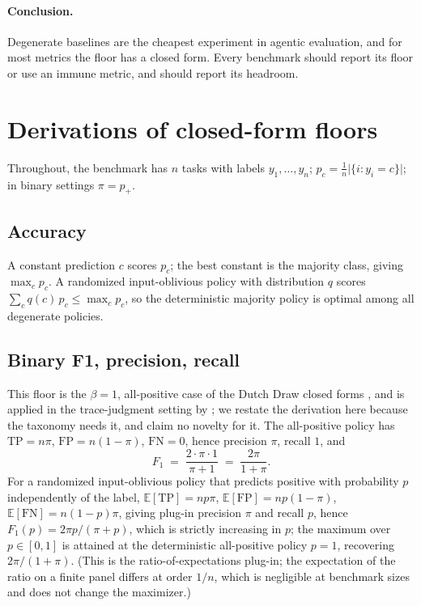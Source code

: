 \documentclass{article}
\theoremstyle{plain}
\theoremstyle{definition}
\begin{document}
\paragraph{Conclusion.}
Degenerate baselines are the cheapest experiment in agentic evaluation, and for most metrics the floor has a closed form. Every benchmark should report its floor or use an immune metric, and should report its headroom.




\appendix

\section{Derivations of closed-form floors}
\label{app:derivations}

Throughout, the benchmark has $n$ tasks with labels $y_1,\dots,y_n$; $p_c = \frac{1}{n}\lvert\{i : y_i = c\}\rvert$; in binary settings $\pi = p_{+}$.

\subsection{Accuracy}
A constant prediction $c$ scores $p_c$; the best constant is the majority class, giving $\max_c p_c$. A randomized input-oblivious policy with distribution $q$ scores $\sum_c q(c)\,p_c \le \max_c p_c$, so the deterministic majority policy is optimal among all degenerate policies.

\subsection{Binary F1, precision, recall}
This floor is the $\beta = 1$, all-positive case of the Dutch Draw closed forms \citep{vandebijl2022dutchdraw}, and is applied in the trace-judgment setting by \citet{wang2026safety}; we restate the derivation here because the taxonomy needs it, and claim no novelty for it. The all-positive policy has $\mathrm{TP} = n\pi$, $\mathrm{FP} = n(1-\pi)$, $\mathrm{FN} = 0$, hence precision $\pi$, recall $1$, and
\begin{equation}
  F_1 \;=\; \frac{2 \cdot \pi \cdot 1}{\pi + 1} \;=\; \frac{2\pi}{1+\pi}.
\end{equation}
For a randomized input-oblivious policy that predicts positive with probability $p$ independently of the label, $\mathbb{E}[\mathrm{TP}] = np\pi$, $\mathbb{E}[\mathrm{FP}] = np(1-\pi)$, $\mathbb{E}[\mathrm{FN}] = n(1-p)\pi$, giving plug-in precision $\pi$ and recall $p$, hence
$F_1(p) = 2\pi p/(\pi + p)$, which is strictly increasing in $p$; the maximum over $p \in [0,1]$ is attained at the deterministic all-positive policy $p = 1$, recovering $2\pi/(1+\pi)$. (This is the ratio-of-expectations plug-in; the expectation of the ratio on a finite panel differs at order $1/n$, which is negligible at benchmark sizes and does not change the maximizer.)
\end{document}
